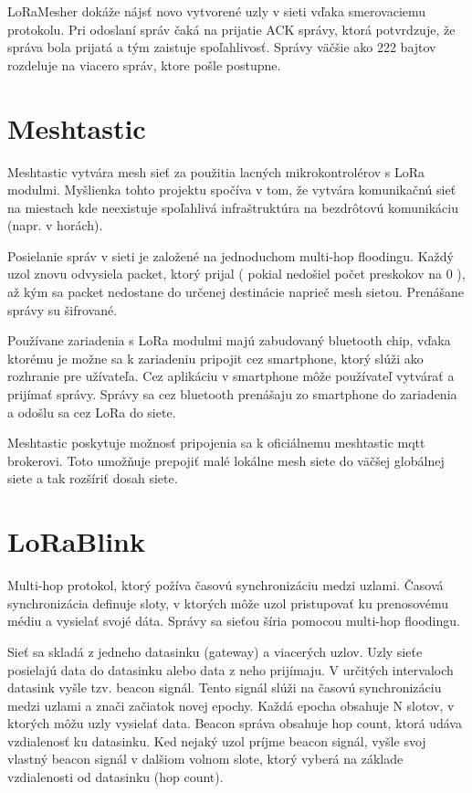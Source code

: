 \documentclass[slovak,master]{diploma}
\begin{document}
LoRaMesher dokáže nájsť novo vytvorené uzly v sieti vďaka smerovaciemu protokolu. Pri odoslaní správ čaká na prijatie ACK správy, ktorá potvrdzuje, 
že správa bola prijatá a tým zaistuje spoľahlivosť. Správy väčšie ako 222 bajtov rozdeluje na viacero správ, ktore pošle postupne.

\section{Meshtastic}
Meshtastic \cite{meshtastic} vytvára mesh sieť za použitia lacných mikrokontrolérov s LoRa modulmi.
Myšlienka tohto projektu spočíva v tom, že vytvára komunikačnú sieť na miestach kde neexistuje spoľahlivá infraštruktúra na bezdrôtovú komunikáciu (napr. v horách).

Posielanie správ v sieti je založené na jednoduchom multi-hop floodingu.
Každý uzol znovu odvysiela packet, ktorý prijal ( pokial nedošiel počet preskokov na 0 ), až kým sa packet nedostane do určenej destinácie naprieč mesh sietou.
Prenášane správy su šifrované.

Používane zariadenia s LoRa modulmi majú zabudovaný bluetooth chip, vďaka ktorému je možne sa k zariadeniu pripojit cez smartphone, ktorý slúži ako rozhranie pre 
užívateľa. Cez aplikáciu v smartphone môže používateľ vytvárať a prijímať správy. Správy sa cez bluetooth prenášaju zo smartphone do zariadenia a odošlu sa cez 
LoRa do siete. %

Meshtastic poskytuje možnosť pripojenia sa k oficiálnemu meshtastic mqtt brokerovi. Toto umožňuje prepojiť malé lokálne mesh siete do väčšej globálnej siete a 
tak rozšíriť dosah siete.

\section{LoRaBlink}
Multi-hop protokol, ktorý požíva časovú synchronizáciu medzi uzlami. Časová synchronizácia definuje sloty, v ktorých môže uzol pristupovať ku prenosovému médiu a 
vysielať svojé dáta. Správy sa sieťou šíria pomocou multi-hop floodingu.

Sieť sa skladá z jedneho datasinku (gateway) a viacerých uzlov. Uzly sieťe posielajú data do datasinku alebo data z neho prijímaju.
V určitých intervaloch datasink vyšle tzv. beacon signál. Tento signál slúži na časovú synchronizáciu medzi uzlami a znači začiatok novej epochy. 
Každá epocha obsahuje N slotov, v ktorých môžu uzly vysielať data. Beacon správa obsahuje hop count, ktorá udáva vzdialenosť ku datasinku.
Ked nejaký uzol príjme beacon signál, vyšle svoj vlastný beacon signál v dalšiom volnom slote, ktorý vyberá na základe vzdialenosti od datasinku (hop count).
\end{document}
